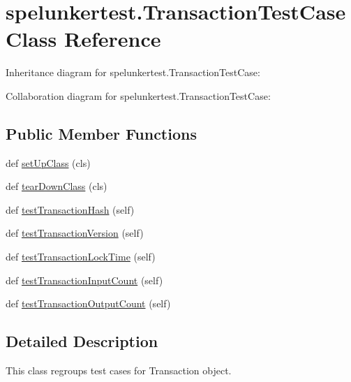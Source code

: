 \hypertarget{classspelunkertest_1_1TransactionTestCase}{}\section{spelunkertest.\+Transaction\+Test\+Case Class Reference}
\label{classspelunkertest_1_1TransactionTestCase}


Inheritance diagram for spelunkertest.\+Transaction\+Test\+Case\+:


Collaboration diagram for spelunkertest.\+Transaction\+Test\+Case\+:
\subsection*{Public Member Functions}
\begin{DoxyCompactItemize}
\item 
def \hyperlink{classspelunkertest_1_1TransactionTestCase_a23fbcf76773698d796a939aeb63b8569}{set\+Up\+Class} (cls)
\item 
def \hyperlink{classspelunkertest_1_1TransactionTestCase_adea12d502b8f3a6960a4f1121548c686}{tear\+Down\+Class} (cls)
\item 
def \hyperlink{classspelunkertest_1_1TransactionTestCase_a502eb880adafcdddda54575746ab30d6}{test\+Transaction\+Hash} (self)
\item 
def \hyperlink{classspelunkertest_1_1TransactionTestCase_ad7dd1243332d69d39cef91088a2b4bce}{test\+Transaction\+Version} (self)
\item 
def \hyperlink{classspelunkertest_1_1TransactionTestCase_a0bf1091a0af31dd9863a9a0adb62f6f9}{test\+Transaction\+Lock\+Time} (self)
\item 
def \hyperlink{classspelunkertest_1_1TransactionTestCase_a9f25efcf0ecb89878bcac94b07dc769c}{test\+Transaction\+Input\+Count} (self)
\item 
def \hyperlink{classspelunkertest_1_1TransactionTestCase_a832c287feabc265e5d730a3fe8a82371}{test\+Transaction\+Output\+Count} (self)
\end{DoxyCompactItemize}


\subsection{Detailed Description}
\begin{DoxyVerb}This class regroups test cases for Transaction object.\end{DoxyVerb}
 

